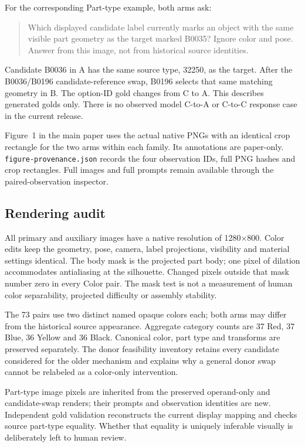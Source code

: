 \documentclass[10pt,twocolumn,letterpaper]{article}
\begin{document}
For the corresponding Part-type example, both arms ask:
\begin{quote}\small
Which displayed candidate label currently marks an object with the
same visible part geometry as the target marked B0035? Ignore color
and pose. Answer from this image, not from historical source identities.
\end{quote}
Candidate B0036 in A has the same source type, 32250, as the target.
After the B0036/B0196 candidate-reference swap, B0196 selects that
same matching geometry in B. The option-ID gold changes from C to A.
This describes generated golds only. There is no observed model
C-to-A or C-to-C response case in the current release.

Figure~1 in the main paper uses the actual native PNGs with an identical
crop rectangle for the two arms within each family. Its annotations
are paper-only. \texttt{figure-provenance.json} records the four
observation IDs, full PNG hashes and crop rectangles. Full images and
full prompts remain available through the paired-observation inspector.

\subsection{Rendering audit}
All primary and auxiliary images have a native resolution of
1280$\times$800. Color edits keep the geometry, pose, camera, label
projections, visibility and material settings identical. The body mask
is the projected part body; one pixel of dilation accommodates
antialiasing at the silhouette. Changed pixels outside that mask
number zero in every Color pair. The mask test is not a measurement
of human color separability, projected difficulty or assembly stability.

The 73 pairs use two distinct named opaque colors each; both arms
may differ from the historical source appearance. Aggregate category
counts are 37 Red, 37 Blue, 36 Yellow and 36 Black. Canonical color,
part type and transforms are preserved separately. The donor
feasibility inventory retains every candidate considered for the older
mechanism and explains why a general donor swap cannot be relabeled
as a color-only intervention.

Part-type image pixels are inherited from the preserved operand-only
and candidate-swap renders; their prompts and observation identities
are new. Independent gold validation reconstructs the current display
mapping and checks source part-type equality. Whether that equality
is uniquely inferable visually is deliberately left to human review.
\end{document}
